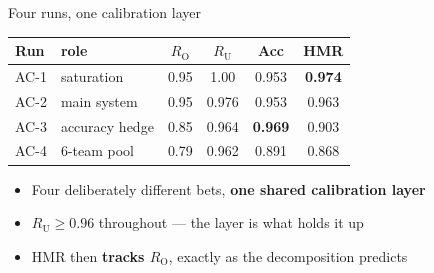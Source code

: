 \documentclass[aspectratio=169,11pt]{beamer}
\newcommand{\HMR}{\textsc{HMR}}
\newcommand{\RO}{R_{\mathrm{O}}}
\newcommand{\RU}{R_{\mathrm{U}}}
\newcommand{\gd}[1]{{\color{good}\textbf{#1}}}
\begin{document}
\begin{frame}{Four runs, one calibration layer}
\centering\vspace{0.3em}
\begin{tabular}{llcccc}
\toprule
Run & role & $\RO$ & $\RU$ & Acc & \HMR\\
\midrule
AC-1 & saturation & 0.95 & 1.00 & 0.953 & \gd{0.974}\\
AC-2 & main system & 0.95 & 0.976 & 0.953 & 0.963\\
AC-3 & accuracy hedge & 0.85 & 0.964 & \textbf{0.969} & 0.903\\
AC-4 & 6-team pool & 0.79 & 0.962 & 0.891 & 0.868\\
\bottomrule
\end{tabular}

\vspace{1.0em}
\begin{itemize}
  \item Four deliberately different bets, \textbf{one shared calibration layer}
  \item $\RU \ge 0.96$ throughout --- the layer is what holds it up
  \item \HMR{} then \textbf{tracks $\RO$}, exactly as the decomposition predicts
\end{itemize}
\end{frame}
\end{document}
